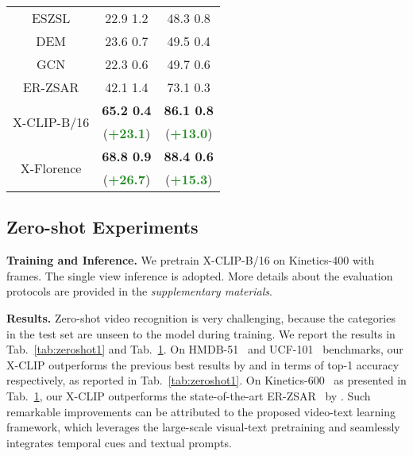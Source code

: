 \documentclass[runningheads]{llncs}
\begin{document}
\begin{table}[t!]
\begin{minipage}{0.48\columnwidth}
{{\begin{tabular}{ccc}
		ESZSL \cite{romera2015embarrassingly} & 22.9  1.2 & 48.3  0.8 \\
		DEM \cite{zhang2017learning}  & 23.6  0.7 & 49.5  0.4 \\
		GCN \cite{ghosh2020all}  & 22.3  0.6 & 49.7  0.6 \\  
		ER-ZSAR \cite{chen2021elaborative} & 42.1  1.4 & 73.1  0.3 \\ \midrule
	    \multirow{2}{*}{X-CLIP-B/16} & \textbf{65.2  0.4} & \textbf{86.1  0.8} \\
	    & (\scriptsize\textcolor{ForestGreen}{\textbf{+23.1}}) &  (\scriptsize\textcolor{ForestGreen}{\textbf{+13.0}}) \\
	    \multirow{2}{*}{X-Florence} & \textbf{68.8  0.9} & \textbf{88.4  0.6} \\
	    & (\scriptsize\textcolor{ForestGreen}{\textbf{+26.7}}) &  (\scriptsize\textcolor{ForestGreen}{\textbf{+15.3}}) \\
		\bottomrule
	\end{tabular}
	}
}
\label{tab:zeroshot2}

\end{minipage}
\vspace{-.47cm}
\end{table} \subsection{Zero-shot Experiments} \label{sec:zero-shot}

\textbf{Training and Inference.} We pretrain X-CLIP-B/16 on Kinetics-400 with  frames. The single view inference is adopted. More details about the evaluation protocols are provided in the \emph{supplementary materials}. 

\textbf{Results.} Zero-shot video recognition is very challenging, because the categories in the test set are unseen to the model during training. We report the results in Tab.~\ref{tab:zeroshot1} and Tab.~\ref{tab:zeroshot2}. On HMDB-51~\cite{kuehne2011hmdb} and UCF-101~\cite{soomro2012ucf101} benchmarks, our X-CLIP outperforms the previous best results by  and  in terms of top-1 accuracy respectively, as reported in Tab.~\ref{tab:zeroshot1}. On Kinetics-600~\cite{k600} as presented in Tab.~\ref{tab:zeroshot2}, our X-CLIP outperforms the state-of-the-art ER-ZSAR~\cite{chen2021elaborative} by . Such remarkable improvements can be attributed to the proposed video-text learning framework, which leverages the large-scale visual-text pretraining and seamlessly integrates temporal cues and textual prompts. 
\end{document}
